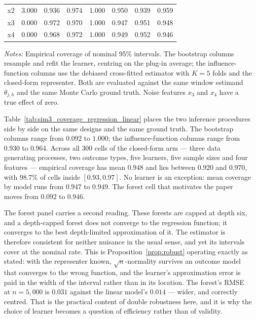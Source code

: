 \documentclass[12pt]{article}
\begin{document}
\begin{table}[htbp]
\begin{threeparttable}
\begin{tabular}{lrrrrrrr}
				\quad x2 & 3.000 & 0.936 & 0.974 & 1.000 & 0.950 & 0.939 & 0.959 \\
				\quad x3 & 0.000 & 0.972 & 0.970 & 1.000 & 0.947 & 0.951 & 0.948 \\
				\quad x4 & 0.000 & 0.968 & 0.972 & 1.000 & 0.949 & 0.952 & 0.946 \\
				\bottomrule
				\end{tabular}
				\begin{tablenotes}
				\footnotesize
				\item \textit{Notes:} Empirical coverage of nominal 95\% intervals. The bootstrap columns resample and refit the learner, centring on the plug-in average; the influence-function columns use the debiased cross-fitted estimator with $K=5$ folds and the closed-form representer. Both are evaluated against the same window estimand $\theta_{j,h}$ and the same Monte Carlo ground truth. Noise features $x_3$ and $x_4$ have a true effect of zero.
				\end{tablenotes}
		\end{threeparttable}
	\end{table}
	
	Table~\ref{tab:sim3_coverage_regression_linear} places the two inference procedures side by side on the same designs and the same ground truth. The bootstrap columns range from $0.092$ to $1.000$; the influence-function columns range from $0.930$ to $0.964$. Across all 300 cells of the closed-form arm --- three data generating processes, two outcome types, five learners, five sample sizes and four features --- empirical coverage has mean $0.948$ and lies between $0.920$ and $0.970$, with $98.7\%$ of cells inside $[0.93, 0.97]$. No learner is an exception: mean coverage by model runs from $0.947$ to $0.949$. The forest cell that motivates the paper moves from $0.092$ to $0.946$.
	
	The forest panel carries a second reading. These forests are capped at depth six, and a depth-capped forest does not converge to the regression function; it converges to the best depth-limited approximation of it. The estimator is therefore consistent for neither nuisance in the usual sense, and yet its intervals cover at the nominal rate. This is Proposition~\ref{prop:robust} operating exactly as stated: with the representer known, $\sqrt{n}$-normality survives an outcome model that converges to the wrong function, and the learner's approximation error is paid in the width of the interval rather than in its location. The forest's RMSE at $n=5{,}000$ is $0.031$ against the linear model's $0.014$ --- wider, and correctly centred. That is the practical content of double robustness here, and it is why the choice of learner becomes a question of efficiency rather than of validity.
	
\end{document}
